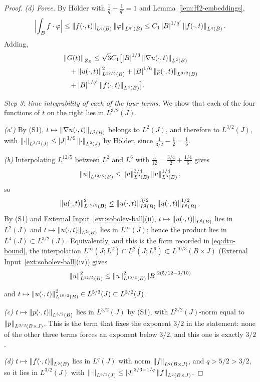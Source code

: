 \documentclass[11pt,reqno]{amsart}
\begin{document}
\begin{proof}
\emph{(d) Force.} By H\"older with $\tfrac1q+\tfrac1{q'}=1$ and
Lemma~\ref{lem:H2-embeddings},
\[
  \Bigl|\int_{B}f\cdot\varphi\Bigr|
  \le\left\lVert f(\cdot,t) \right\rVert_{L^{q}(B)}\left\lVert \varphi \right\rVert_{L^{q'}(B)}
  \le C_{1}\left\lvert B \right\rvert^{1/q'}\left\lVert f(\cdot,t) \right\rVert_{L^{q}(B)} .
\]
Adding,
\[
\begin{aligned}
&\left\lVert G(t) \right\rVert_{Z_{B}}\le\sqrt{3}C_{1}\bigl[\left\lvert B \right\rvert^{1/3}\left\lVert \nabla u(\cdot,t) \right\rVert_{L^{2}(B)}
\\ &\quad+\left\lVert u(\cdot,t) \right\rVert_{L^{12/5}(B)}^{2}+\left\lvert B \right\rvert^{1/6}\left\lVert p(\cdot,t) \right\rVert_{L^{3/2}(B)}
\\ &\quad+\left\lvert B \right\rvert^{1/q'}\left\lVert f(\cdot,t) \right\rVert_{L^{q}(B)}\bigr].\end{aligned}\]

\emph{Step 3: time integrability of each of the four terms.} We show that each
of the four functions of $t$ on the right lies in $L^{3/2}(J)$.

\emph{(a$'$)} By (S1), $t\mapsto\left\lVert \nabla u(\cdot,t) \right\rVert_{L^{2}(B)}$ belongs
to $L^{2}(J)$, and therefore to $L^{3/2}(J)$, with
$\left\lVert \cdot \right\rVert_{L^{3/2}(J)}\le\left\lvert J \right\rvert^{1/6}\left\lVert \cdot \right\rVert_{L^{2}(J)}$ by H\"older,
since $\tfrac1{3/2}-\tfrac12=\tfrac16$.

\emph{(b)} Interpolating $L^{12/5}$ between $L^{2}$ and $L^{6}$ with
$\tfrac{5}{12}=\tfrac{3/4}{2}+\tfrac{1/4}{6}$ gives
\[
\left\lVert u \right\rVert_{L^{12/5}(B)}\le\left\lVert u \right\rVert_{L^{2}(B)}^{3/4}\left\lVert u \right\rVert_{L^{6}(B)}^{1/4}
,
\]
so
\[
\left\lVert u(\cdot,t) \right\rVert_{L^{12/5}(B)}^{2}
 \le\left\lVert u(\cdot,t) \right\rVert_{L^{2}(B)}^{3/2}\left\lVert u(\cdot,t) \right\rVert_{L^{6}(B)}^{1/2}
.
\]
By (S1) and External Input~\ref{ext:sobolev-ball}(ii),
$t\mapsto\left\lVert u(\cdot,t) \right\rVert_{L^{6}(B)}$ lies in $L^{2}(J)$ and
$t\mapsto\left\lVert u(\cdot,t) \right\rVert_{L^{2}(B)}$ lies in $L^{\infty}(J)$; hence the
product lies in $L^{4}(J)\subset L^{3/2}(J)$. Equivalently, and this is the form
recorded in \eqref{eq:dtu-bound}, the interpolation
$L^{\infty}(J;L^{2})\cap L^{2}(J;L^{6})\subset L^{10/3}(B\times J)$
(External Input~\ref{ext:sobolev-ball}(iv)) gives
\[
\left\lVert u \right\rVert^{2}_{L^{12/5}(B)}\le\left\lVert u \right\rVert^{2}_{L^{10/3}(B)}\left\lvert B \right\rvert^{2(5/12-3/10)}
\]

and $t\mapsto\left\lVert u(\cdot,t) \right\rVert^{2}_{L^{10/3}(B)}\in L^{5/3}(J)\subset L^{3/2}(J)$.

\emph{(c)} $t\mapsto\left\lVert p(\cdot,t) \right\rVert_{L^{3/2}(B)}$ lies in $L^{3/2}(J)$ by
(S1), with $L^{3/2}(J)$-norm equal to $\left\lVert p \right\rVert_{L^{3/2}(B\times J)}$. This is
the term that fixes the exponent $3/2$ in the statement: none of the other three
terms forces an exponent below $3/2$, and this one is exactly $3/2$.

\emph{(d)} $t\mapsto\left\lVert f(\cdot,t) \right\rVert_{L^{q}(B)}$ lies in $L^{q}(J)$ with norm
$\left\lVert f \right\rVert_{L^{q}(B\times J)}$, and $q>5/2>3/2$, so it lies in $L^{3/2}(J)$ with
$\left\lVert \cdot \right\rVert_{L^{3/2}(J)}\le\left\lvert J \right\rvert^{2/3-1/q}\left\lVert f \right\rVert_{L^{q}(B\times J)}$.


\end{proof}
\end{document}
